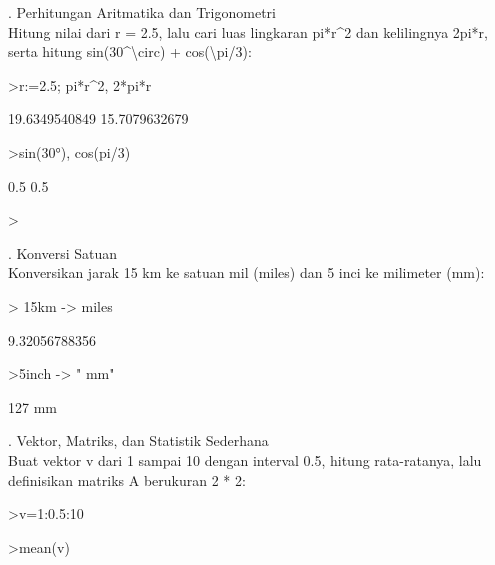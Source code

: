 \documentclass{article}
\newenvironment{eulernotebook}{\par}{\par}
\newenvironment{eulercomment}{\par\medskip}{\par\medskip}
\begin{document}
\begin{eulernotebook}
\begin{eulercomment}
1. Perhitungan Aritmatika dan Trigonometri\\
Hitung nilai dari r = 2.5, lalu cari luas lingkaran pi*r\textasciicircum{}2 dan
kelilingnya 2pi*r, serta hitung sin(30\textasciicircum{}\textbackslash{}circ) + cos(\textbackslash{}pi/3):
\end{eulercomment}
\begin{eulerprompt}
>r:=2.5; pi*r^2, 2*pi*r
\end{eulerprompt}
\begin{euleroutput}
  19.6349540849
  15.7079632679
\end{euleroutput}
\begin{eulerprompt}
>sin(30°), cos(pi/3)
\end{eulerprompt}
\begin{euleroutput}
  0.5
  0.5
\end{euleroutput}
\begin{eulerprompt}
> 
\end{eulerprompt}
\begin{eulercomment}
2. Konversi Satuan\\
Konversikan jarak 15 km ke satuan mil (miles) dan 5 inci ke milimeter
(mm):
\end{eulercomment}
\begin{eulerprompt}
> 15km -> miles 
\end{eulerprompt}
\begin{euleroutput}
  9.32056788356
\end{euleroutput}
\begin{eulerprompt}
>5inch -> " mm"
\end{eulerprompt}
\begin{euleroutput}
  127 mm
\end{euleroutput}
\begin{eulercomment}
3. Vektor, Matriks, dan Statistik Sederhana\\
Buat vektor v dari 1 sampai 10 dengan interval 0.5, hitung
rata-ratanya, lalu definisikan matriks A berukuran 2 * 2:
\end{eulercomment}
\begin{eulerprompt}
>v=1:0.5:10
\end{eulerprompt}
\begin{euleroutput}
  [1,  1.5,  2,  2.5,  3,  3.5,  4,  4.5,  5,  5.5,  6,  6.5,  7,  7.5,
  8,  8.5,  9,  9.5,  10]
\end{euleroutput}
\begin{eulerprompt}
>mean(v)
\end{eulerprompt}
\begin{euleroutput}

\end{euleroutput}
\end{eulernotebook}
\end{document}
